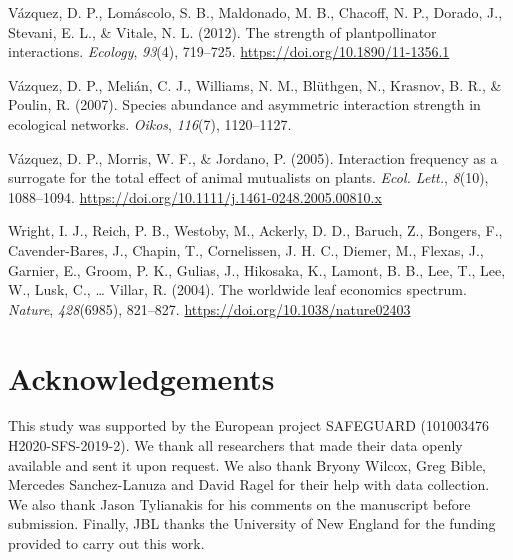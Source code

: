 \documentclass[
  12pt,
  a4paper,
]{article}
\newlength{\cslhangindent}
\newlength{\cslentryspacingunit} %
\newenvironment{CSLReferences}[2] %
 {%
  \setlength{\parindent}{0pt}
  \ifodd #1
  \let\oldpar\par
  \def\par{\hangindent=\cslhangindent\oldpar}
  \fi
  \setlength{\parskip}{#2\cslentryspacingunit}
 }%
 {}
\begin{document}
\begin{CSLReferences}{1}{0}
\leavevmode{}%
Vázquez, D. P., Lomáscolo, S. B., Maldonado, M. B., Chacoff, N. P., Dorado, J., Stevani, E. L., \& Vitale, N. L. (2012). The strength of plant\textendash pollinator interactions. \emph{Ecology}, \emph{93}(4), 719--725. \url{https://doi.org/10.1890/11-1356.1}

\leavevmode{}%
Vázquez, D. P., Melián, C. J., Williams, N. M., Blüthgen, N., Krasnov, B. R., \& Poulin, R. (2007). Species abundance and asymmetric interaction strength in ecological networks. \emph{Oikos}, \emph{116}(7), 1120--1127.

\leavevmode{}%
Vázquez, D. P., Morris, W. F., \& Jordano, P. (2005). Interaction frequency as a surrogate for the total effect of animal mutualists on plants. \emph{Ecol. Lett.}, \emph{8}(10), 1088--1094. \url{https://doi.org/10.1111/j.1461-0248.2005.00810.x}

\leavevmode{}%
Wright, I. J., Reich, P. B., Westoby, M., Ackerly, D. D., Baruch, Z., Bongers, F., Cavender-Bares, J., Chapin, T., Cornelissen, J. H. C., Diemer, M., Flexas, J., Garnier, E., Groom, P. K., Gulias, J., Hikosaka, K., Lamont, B. B., Lee, T., Lee, W., Lusk, C., \ldots{} Villar, R. (2004). The worldwide leaf economics spectrum. \emph{Nature}, \emph{428}(6985), 821--827. \url{https://doi.org/10.1038/nature02403}

\end{CSLReferences}

\hypertarget{acknowledgements}{%
\section{Acknowledgements}\label{acknowledgements}}

This study was supported by the European project SAFEGUARD (101003476 H2020-SFS-2019-2). We thank all researchers that made their data openly available and sent it upon request. We also thank Bryony Wilcox, Greg Bible, Mercedes Sanchez-Lanuza and David Ragel for their help with data collection. We also thank Jason Tylianakis for his comments on the manuscript before submission. Finally, JBL thanks the University of New England for the funding provided to carry out this work.

\singlespacing
\end{document}
